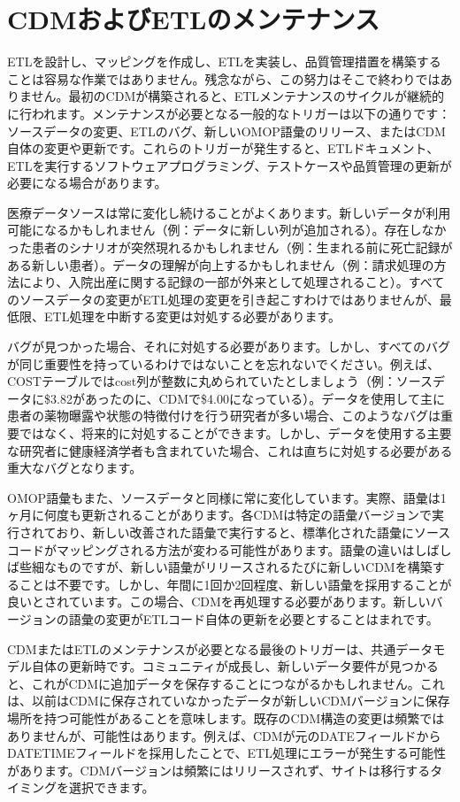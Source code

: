 \documentclass[
  11pt]{book}
\theoremstyle{definition}
\theoremstyle{definition}
\theoremstyle{definition}
\theoremstyle{definition}
\theoremstyle{remark}
\begin{document}
\section{CDMおよびETLのメンテナンス}\label{CDMandETLMaintenance}

ETLを設計し、マッピングを作成し、ETLを実装し、品質管理措置を構築することは容易な作業ではありません。残念ながら、この努力はそこで終わりではありません。最初のCDMが構築されると、ETLメンテナンスのサイクルが継続的に行われます。メンテナンスが必要となる一般的なトリガーは以下の通りです：ソースデータの変更、ETLのバグ、新しいOMOP語彙のリリース、またはCDM自体の変更や更新です。これらのトリガーが発生すると、ETLドキュメント、ETLを実行するソフトウェアプログラミング、テストケースや品質管理の更新が必要になる場合があります。

医療データソースは常に変化し続けることがよくあります。新しいデータが利用可能になるかもしれません（例：データに新しい列が追加される）。存在しなかった患者のシナリオが突然現れるかもしれません（例：生まれる前に死亡記録がある新しい患者）。データの理解が向上するかもしれません（例：請求処理の方法により、入院出産に関する記録の一部が外来として処理されること）。すべてのソースデータの変更がETL処理の変更を引き起こすわけではありませんが、最低限、ETL処理を中断する変更は対処する必要があります。

バグが見つかった場合、それに対処する必要があります。しかし、すべてのバグが同じ重要性を持っているわけではないことを忘れないでください。例えば、COSTテーブルではcost列が整数に丸められていたとしましょう（例：ソースデータに\$3.82があったのに、CDMで\$4.00になっている）。データを使用して主に患者の薬物曝露や状態の特徴付けを行う研究者が多い場合、このようなバグは重要ではなく、将来的に対処することができます。しかし、データを使用する主要な研究者に健康経済学者も含まれていた場合、これは直ちに対処する必要がある重大なバグとなります。

OMOP語彙もまた、ソースデータと同様に常に変化しています。実際、語彙は1ヶ月に何度も更新されることがあります。各CDMは特定の語彙バージョンで実行されており、新しい改善された語彙で実行すると、標準化された語彙にソースコードがマッピングされる方法が変わる可能性があります。語彙の違いはしばしば些細なものですが、新しい語彙がリリースされるたびに新しいCDMを構築することは不要です。しかし、年間に1回か2回程度、新しい語彙を採用することが良いとされています。この場合、CDMを再処理する必要があります。新しいバージョンの語彙の変更がETLコード自体の更新を必要とすることはまれです。

CDMまたはETLのメンテナンスが必要となる最後のトリガーは、共通データモデル自体の更新時です。コミュニティが成長し、新しいデータ要件が見つかると、これがCDMに追加データを保存することにつながるかもしれません。これは、以前はCDMに保存されていなかったデータが新しいCDMバージョンに保存場所を持つ可能性があることを意味します。既存のCDM構造の変更は頻繁ではありませんが、可能性はあります。例えば、CDMが元のDATEフィールドからDATETIMEフィールドを採用したことで、ETL処理にエラーが発生する可能性があります。CDMバージョンは頻繁にはリリースされず、サイトは移行するタイミングを選択できます。
\end{document}
